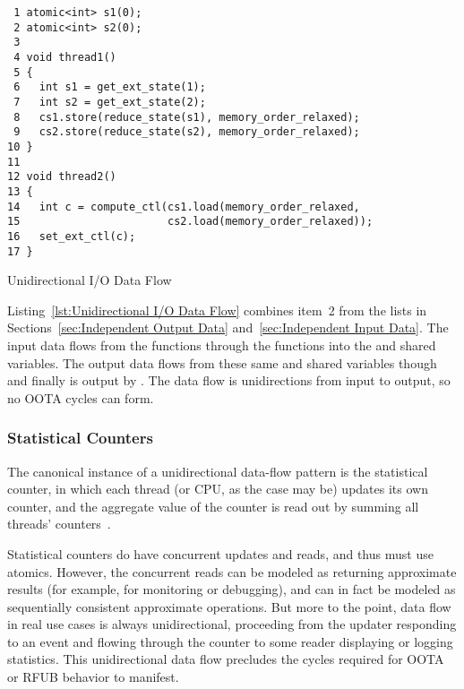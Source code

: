 \documentclass[10]{article}
\begin{document}
\begin{listing}[tbp]
\begin{verbatim}
 1 atomic<int> s1(0);
 2 atomic<int> s2(0);
 3
 4 void thread1()
 5 {
 6   int s1 = get_ext_state(1);
 7   int s2 = get_ext_state(2);
 8   cs1.store(reduce_state(s1), memory_order_relaxed);
 9   cs2.store(reduce_state(s2), memory_order_relaxed);
10 }
11
12 void thread2()
13 {
14   int c = compute_ctl(cs1.load(memory_order_relaxed,
15                       cs2.load(memory_order_relaxed));
16   set_ext_ctl(c);
17 }
\end{verbatim}
\caption{Unidirectional I/O Data Flow}
\label{lst:Unidirectional I/O Data Flow}
\end{listing}

Listing~\ref{lst:Unidirectional I/O Data Flow}
combines item~2 from the lists in
Sections~\ref{sec:Independent Output Data}
and~\ref{sec:Independent Input Data}.
The  input data flows from the  functions
through the  functions into the  and 
shared variables.
The  output data flows from these same  and 
shared variables though  and finally is output
by .
The data flow is unidirections from input to output, so no OOTA cycles
can form.

\subsubsection{Statistical Counters}
\label{sec:Statistical Counters}

The canonical instance of a unidirectional data-flow pattern is the
statistical counter, in which each thread (or CPU, as the case may be)
updates its own counter, and the aggregate value of the counter is read
out by summing all threads'
counters~\cite[Section 5.2]{McKenney2018ParallelProgramming-2018-12-08a}.

Statistical counters do have concurrent updates and reads, and thus must
use atomics.
However, the concurrent reads can be modeled as returning approximate
results (for example, for monitoring or debugging), and can in fact be
modeled as sequentially consistent approximate operations.
But more to the point, data flow in real use cases is always
unidirectional, proceeding from the updater responding to an event
and flowing through the counter to some reader displaying or logging
statistics.
This unidirectional data flow precludes the cycles required for OOTA or
RFUB behavior to manifest.
\end{document}
